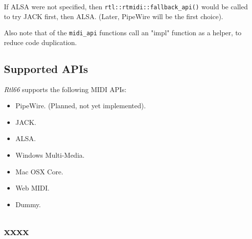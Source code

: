    If ALSA were not specified, then
   \texttt{rtl::rtmidi::fallback\_api()} would be
   called to try JACK first, then ALSA.
   (Later, PipeWire will be the first choice).

   Also note that of the \texttt{midi\_api} functions call
   an "impl" function as a helper, to reduce code duplication.


\subsection{Supported APIs}
\label{subsec:supported_apis}

   \textsl{Rtl66} supports the following MIDI APIs:

   \begin{itemize}
      \item PipeWire. (Planned, not yet implemented).
      \item JACK.
      \item ALSA.
      \item Windows Multi-Media.
      \item Mac OSX Core.
      \item Web MIDI.
      \item Dummy.
   \end{itemize}

\subsection{xxxx}
\label{subsec:xxxx}


